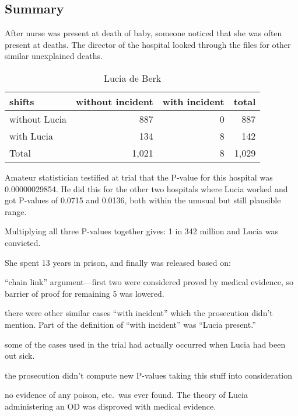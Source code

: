 \documentclass[letterpaper, landscape]{exam}
\begin{document}
  \subsection{Summary} %
  
  After nurse was present at death of baby, someone noticed that she was often
  present at deaths. The director of the hospital looked through the files for
  other similar unexplained deaths. 

  \begin{table}[H]
    \centering
    \begin{tabular}{lrrr}
      \toprule
      shifts        & without incident & with incident & total \\
      \midrule
      without Lucia & 887              & 0             & 887 \\
      with Lucia    & 134              & 8             & 142 \\
      Total         & 1,021            & 8             & 1,029 \\
      \bottomrule
    \end{tabular}
    \caption{Lucia de Berk}\label{tab:ldb1}
  \end{table}

  Amateur statistician testified at trial that the P-value for this hospital was
  0.00000029854. He did this for the other two hospitals where Lucia worked and
  got P-values of 0.0715 and 0.0136, both within the unusual but still plausible
  range.

  Multiplying all three P-values together gives: 1 in 342 million and Lucia was
  convicted.

  She spent 13 years in prison, and finally was released based on:
  \begin{itemize*}
    \item ``chain link'' argument---first two were considered proved by medical
      evidence, so barrier of proof for remaining 5 was lowered.

    \item there were other similar cases ``with incident'' which the prosecution
      didn't mention. Part of the definition of ``with incident'' was ``Lucia
      present.''

    \item some of the cases used in the trial had actually occurred when Lucia
      had been out sick.

    \item the prosecution didn't compute new P-values taking this stuff into
      consideration

    \item no evidence of any poison, etc.\ was ever found. The theory of Lucia
      administering an OD was disproved with medical evidence. 
  \end{itemize*}
  
\end{document}
